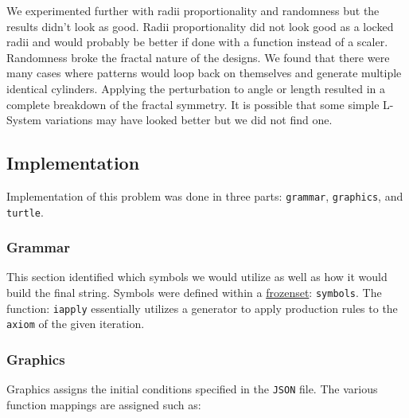 We experimented further with radii proportionality and randomness but the 
results didn't look as good. Radii proportionality did not look good as a 
locked radii and would probably be better if done with a function instead of a 
scaler. Randomness broke the fractal nature of the designs. We found that there 
were many cases where patterns would loop back on themselves and generate 
multiple identical cylinders. Applying the perturbation to angle or length 
resulted in a complete breakdown of the fractal symmetry. It is possible that 
some simple L-System variations may have looked better but we did not find one.




\subsection{Implementation}
Implementation of this problem was done in three parts: \texttt{grammar}, 
\texttt{graphics}, and \texttt{turtle}. 

\subsubsection{Grammar}
This section identified which symbols we would utilize as well as how it would 
build the final string. Symbols were defined within a 
\href{https://docs.python.org/3/library/stdtypes.html#frozenset}{frozenset}: 
\texttt{symbols}. The function: \texttt{iapply} essentially 
utilizes a generator to apply production rules to the \texttt{axiom} of the 
given iteration.

\subsubsection{Graphics}
Graphics assigns the initial conditions specified in the \texttt{JSON} file. 
The various function mappings are assigned such as:

